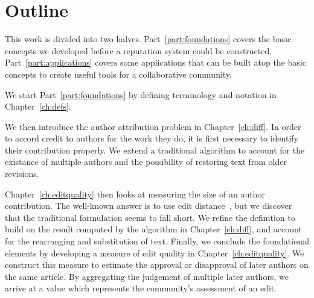\section{Outline}

This work is divided into two halves.
Part~\ref{part:foundations} covers the basic concepts we developed
before a reputation system could be constructed.
Part~\ref{part:applications} covers some applications that can
be built atop the basic concepts to create useful tools for
a collaborative community.

We start Part~\ref{part:foundations}
by defining terminology and notation in Chapter~\ref{ch:defs}.

We then introduce the author attribution problem in Chapter~\ref{ch:diff}.
In order to accord credit to authors for the work they do,
it is first necessary to identify their contribution properly.
We extend a traditional  algorithm to
account for the existance of multiple authors and the possibility
of restoring text from older revisions.

Chapter~\ref{ch:editquality} then looks at measuring the size of
an author contribution.
The well-known answer is to use edit distance~\cite{Levenshtein1966},
but we discover that the traditional formulation seems to fall short.
We refine the definition to build on the result computed by the
algorithm in Chapter~\ref{ch:diff}, and account for the rearranging
and substitution of text.
Finally, we conclude the foundational elements by developing a measure
of edit quality in Chapter~\ref{ch:editquality}.
We construct this measure to estimate the approval or disapproval of
later authors on the same article.
By aggregating the judgement of multiple later authors, we arrive at
a value which represents the community's assessment of an edit.


